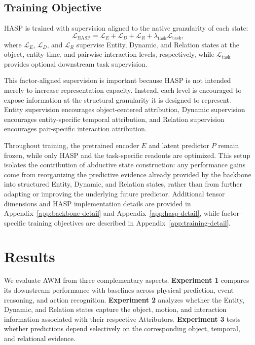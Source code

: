 \documentclass{article}
\begin{document}
\subsection{Training Objective}
HASP is trained with supervision aligned to the native granularity of each state:
\begin{equation}
    \mathcal{L}_{\mathrm{HASP}}
    =
    \mathcal{L}_E
    + \mathcal{L}_D
    + \mathcal{L}_R
    + \lambda_{\mathrm{task}}\mathcal{L}_{\mathrm{task}},
    \label{eq:hasp-loss}
\end{equation}
where $\mathcal{L}_E$, $\mathcal{L}_D$, and $\mathcal{L}_R$ supervise Entity, Dynamic, and Relation states at the object, entity-time, and pairwise interaction levels, respectively, while $\mathcal{L}_{\mathrm{task}}$ provides optional downstream task supervision.

This factor-aligned supervision is important because HASP is not intended merely to increase representation capacity. Instead, each level is encouraged to expose information at the structural granularity it is designed to represent. Entity supervision encourages object-centered attribution, Dynamic supervision encourages entity-specific temporal attribution, and Relation supervision encourages pair-specific interaction attribution.

Throughout training, the pretrained encoder $E$ and latent predictor $P$ remain frozen, while only HASP and the task-specific readouts are optimized. This setup isolates the contribution of abductive state construction: any performance gains come from reorganizing the predictive evidence already provided by the backbone into structured Entity, Dynamic, and Relation states, rather than from further adapting or improving the underlying future predictor.
Additional tensor dimensions and HASP implementation details are provided in Appendix~\ref{app:backbone-detail} and Appendix~\ref{app:hasp-detail}, while factor-specific training objectives are described in Appendix~\ref{app:training-detail}.

\section{Results}

We evaluate AWM from three complementary aspects.
\textbf{Experiment 1} compares its downstream performance with baselines across physical prediction, event reasoning, and action recognition.
\textbf{Experiment 2} analyzes whether the Entity, Dynamic, and Relation states capture the object, motion, and interaction information associated with their respective Attributors.
\textbf{Experiment 3} tests whether predictions depend selectively on the corresponding object, temporal, and relational evidence.
\end{document}
